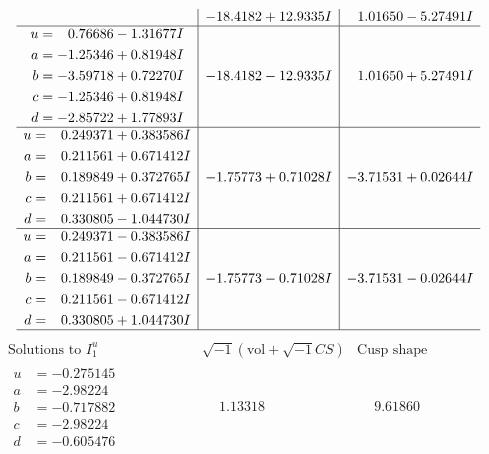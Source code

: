 \documentclass[1p]{elsarticle_modified}
\theoremstyle{definition}
\newcommand{\I}{\sqrt{-1}}
\begin{document}
$$\begin{array}{c|c|c}
 & -18.4182 + 12.9335 I & \phantom{-}1.01650 - 5.27491 I \\ \hline\begin{aligned}
u &= \phantom{-}0.76686 - 1.31677 I \\
a &= -1.25346 + 0.81948 I \\
b &= -3.59718 + 0.72270 I \\
c &= -1.25346 + 0.81948 I \\
d &= -2.85722 + 1.77893 I\end{aligned}
 & -18.4182 - 12.9335 I & \phantom{-}1.01650 + 5.27491 I \\ \hline\begin{aligned}
u &= \phantom{-}0.249371 + 0.383586 I \\
a &= \phantom{-}0.211561 + 0.671412 I \\
b &= \phantom{-}0.189849 + 0.372765 I \\
c &= \phantom{-}0.211561 + 0.671412 I \\
d &= \phantom{-}0.330805 - 1.044730 I\end{aligned}
 & -1.75773 + 0.71028 I & -3.71531 + 0.02644 I \\ \hline\begin{aligned}
u &= \phantom{-}0.249371 - 0.383586 I \\
a &= \phantom{-}0.211561 - 0.671412 I \\
b &= \phantom{-}0.189849 - 0.372765 I \\
c &= \phantom{-}0.211561 - 0.671412 I \\
d &= \phantom{-}0.330805 + 1.044730 I\end{aligned}
 & -1.75773 - 0.71028 I & -3.71531 - 0.02644 I\\
 \hline 
 \end{array}$$\newpage$$\begin{array}{c|c|c}  
\text{Solutions to }I^u_{1}& \I (\text{vol} + \sqrt{-1}CS) & \text{Cusp shape}\\
 \hline 
\begin{aligned}
u &= -0.275145\phantom{ +0.000000I} \\
a &= -2.98224\phantom{ +0.000000I} \\
b &= -0.717882\phantom{ +0.000000I} \\
c &= -2.98224\phantom{ +0.000000I} \\
d &= -0.605476\phantom{ +0.000000I}\end{aligned}
 & \phantom{-}1.13318\phantom{ +0.000000I} & \phantom{-}9.61860\phantom{ +0.000000I} \\ \hline\begin{aligned}

\end{aligned}
\end{array}$$
\end{document}
